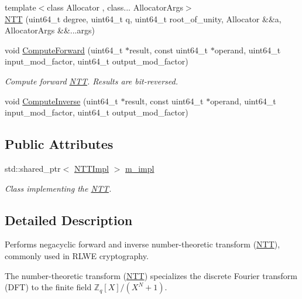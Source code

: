 \begin{DoxyCompactItemize}
{\footnotesize template$<$class Allocator , class... Allocator\-Args$>$ }\\\hyperlink{classhetest_1_1utils_1_1NTT_a9877fee08ac585be045a20d8b561d8d1}{N\-T\-T} (uint64\-\_\-t degree, uint64\-\_\-t q, uint64\-\_\-t root\-\_\-of\-\_\-unity, Allocator \&\&a, Allocator\-Args \&\&...args)
\item 
void \hyperlink{classhetest_1_1utils_1_1NTT_af23d2bdd9a1a5ca7fa8d5b7333776ad4}{Compute\-Forward} (uint64\-\_\-t $\ast$result, const uint64\-\_\-t $\ast$operand, uint64\-\_\-t input\-\_\-mod\-\_\-factor, uint64\-\_\-t output\-\_\-mod\-\_\-factor)
\begin{DoxyCompactList}\small\item\em Compute forward \hyperlink{classhetest_1_1utils_1_1NTT}{N\-T\-T}. Results are bit-\/reversed. \end{DoxyCompactList}\item 
void \hyperlink{classhetest_1_1utils_1_1NTT_a0452a339ac9025c750decbb6e011148b}{Compute\-Inverse} (uint64\-\_\-t $\ast$result, const uint64\-\_\-t $\ast$operand, uint64\-\_\-t input\-\_\-mod\-\_\-factor, uint64\-\_\-t output\-\_\-mod\-\_\-factor)
\end{DoxyCompactItemize}
\subsection*{Public Attributes}
\begin{DoxyCompactItemize}
\item 
std\-::shared\-\_\-ptr$<$ \hyperlink{classhetest_1_1utils_1_1NTT_1_1NTTImpl}{N\-T\-T\-Impl} $>$ \hyperlink{classhetest_1_1utils_1_1NTT_ae2d7985d8380a7c30cb0ca745aa900f5}{m\-\_\-impl}
\begin{DoxyCompactList}\small\item\em Class implementing the \hyperlink{classhetest_1_1utils_1_1NTT}{N\-T\-T}. \end{DoxyCompactList}\end{DoxyCompactItemize}


\subsection{Detailed Description}
Performs negacyclic forward and inverse number-\/theoretic transform (\hyperlink{classhetest_1_1utils_1_1NTT}{N\-T\-T}), commonly used in R\-L\-W\-E cryptography. 

The number-\/theoretic transform (\hyperlink{classhetest_1_1utils_1_1NTT}{N\-T\-T}) specializes the discrete Fourier transform (D\-F\-T) to the finite field $ \mathbb{Z}_q[X] / (X^N + 1) $. 

